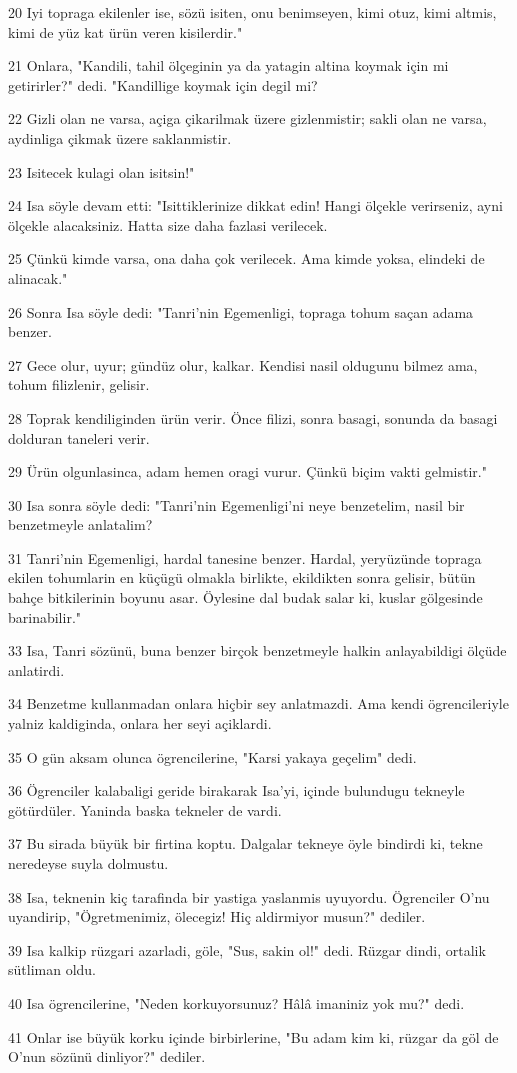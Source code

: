 \par 20 Iyi topraga ekilenler ise, sözü isiten, onu benimseyen, kimi otuz, kimi altmis, kimi de yüz kat ürün veren kisilerdir."
\par 21 Onlara, "Kandili, tahil ölçeginin ya da yatagin altina koymak için mi getirirler?" dedi. "Kandillige koymak için degil mi?
\par 22 Gizli olan ne varsa, açiga çikarilmak üzere gizlenmistir; sakli olan ne varsa, aydinliga çikmak üzere saklanmistir.
\par 23 Isitecek kulagi olan isitsin!"
\par 24 Isa söyle devam etti: "Isittiklerinize dikkat edin! Hangi ölçekle verirseniz, ayni ölçekle alacaksiniz. Hatta size daha fazlasi verilecek.
\par 25 Çünkü kimde varsa, ona daha çok verilecek. Ama kimde yoksa, elindeki de alinacak."
\par 26 Sonra Isa söyle dedi: "Tanri'nin Egemenligi, topraga tohum saçan adama benzer.
\par 27 Gece olur, uyur; gündüz olur, kalkar. Kendisi nasil oldugunu bilmez ama, tohum filizlenir, gelisir.
\par 28 Toprak kendiliginden ürün verir. Önce filizi, sonra basagi, sonunda da basagi dolduran taneleri verir.
\par 29 Ürün olgunlasinca, adam hemen oragi vurur. Çünkü biçim vakti gelmistir."
\par 30 Isa sonra söyle dedi: "Tanri'nin Egemenligi'ni neye benzetelim, nasil bir benzetmeyle anlatalim?
\par 31 Tanri'nin Egemenligi, hardal tanesine benzer. Hardal, yeryüzünde topraga ekilen tohumlarin en küçügü olmakla birlikte, ekildikten sonra gelisir, bütün bahçe bitkilerinin boyunu asar. Öylesine dal budak salar ki, kuslar gölgesinde barinabilir."
\par 33 Isa, Tanri sözünü, buna benzer birçok benzetmeyle halkin anlayabildigi ölçüde anlatirdi.
\par 34 Benzetme kullanmadan onlara hiçbir sey anlatmazdi. Ama kendi ögrencileriyle yalniz kaldiginda, onlara her seyi açiklardi.
\par 35 O gün aksam olunca ögrencilerine, "Karsi yakaya geçelim" dedi.
\par 36 Ögrenciler kalabaligi geride birakarak Isa'yi, içinde bulundugu tekneyle götürdüler. Yaninda baska tekneler de vardi.
\par 37 Bu sirada büyük bir firtina koptu. Dalgalar tekneye öyle bindirdi ki, tekne neredeyse suyla dolmustu.
\par 38 Isa, teknenin kiç tarafinda bir yastiga yaslanmis uyuyordu. Ögrenciler O'nu uyandirip, "Ögretmenimiz, ölecegiz! Hiç aldirmiyor musun?" dediler.
\par 39 Isa kalkip rüzgari azarladi, göle, "Sus, sakin ol!" dedi. Rüzgar dindi, ortalik sütliman oldu.
\par 40 Isa ögrencilerine, "Neden korkuyorsunuz? Hâlâ imaniniz yok mu?" dedi.
\par 41 Onlar ise büyük korku içinde birbirlerine, "Bu adam kim ki, rüzgar da göl de O'nun sözünü dinliyor?" dediler.

